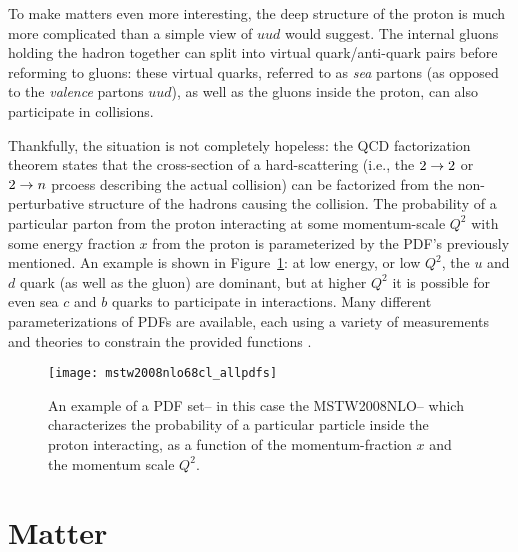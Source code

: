 To make matters even more interesting, the deep structure of the proton is much more complicated than a simple view of $uud$ would suggest. The internal gluons holding the hadron together can split into virtual quark/anti-quark pairs before reforming to gluons: these virtual quarks, referred to as \textit{sea} partons (as opposed to the \textit{valence} partons $uud$), as well as the gluons inside the proton, can also participate in collisions.

Thankfully, the situation is not completely hopeless: the QCD factorization theorem states that the cross-section of a hard-scattering (i.e., the $2\rightarrow2$ or $2\rightarrow n$ prcoess describing the actual collision) can be factorized from the non-perturbative structure of the hadrons causing the collision. The probability of a particular parton from the proton interacting at some momentum-scale $Q^2$ with some energy fraction $x$ from the proton is parameterized by the PDF's previously mentioned. An example is shown in Figure~\ref{fig:sm:pdf}: at low energy, or low $Q^2$, the $u$ and $d$ quark (as well as the gluon) are dominant, but at higher $Q^2$ it is possible for even sea $c$ and $b$ quarks to participate in interactions. Many different parameterizations of PDFs are available, each using a variety of measurements and theories to constrain the provided functions .




\begin{figure}
\centering
\texttt{[image: mstw2008nlo68cl\_allpdfs]}
\label{fig:sm:pdf}
\caption{An example of a PDF set-- in this case the MSTW2008NLO-- which characterizes the probability of a particular particle inside the proton interacting, as a function of the momentum-fraction $x$ and the momentum scale $Q^2$.}
\end{figure}




\section{Matter}
\label{chapter:sm:matter}

